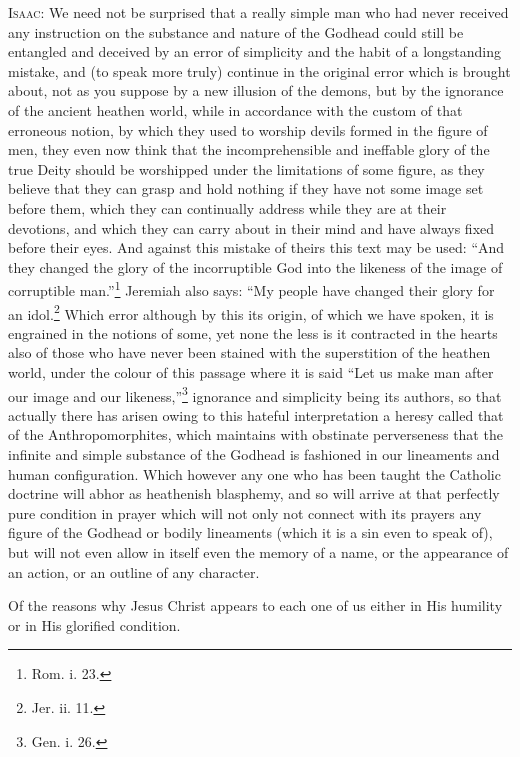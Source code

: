 \textsc{Isaac}: We need not be surprised that a really simple man who had never received any instruction on the substance and nature of the Godhead could still be entangled and deceived by an error of simplicity and the habit of a longstanding mistake, and (to speak more truly) continue in the original error which is brought about, not as you suppose by a new illusion of the demons, but by the ignorance of the ancient heathen world, while in accordance with the custom of that erroneous notion, by which they used to worship devils formed in the figure of men, they even now think that the incomprehensible and ineffable glory of the true Deity should be worshipped under the limitations of some figure, as they believe that they can grasp and hold nothing if they have not some image set before them, which they can continually address while they are at their devotions, and which they can carry about in their mind and have always fixed before their eyes. And against this mistake of theirs this text may be used: “And they changed the glory of the incorruptible God into the likeness of the image of corruptible man.”\footnote{Rom. i. 23.} Jeremiah also says: “My people have changed their glory for an idol.\footnote{Jer. ii. 11.} Which error although by this its origin, of which we have spoken, it is engrained in the notions of some, yet none the less is it contracted in the hearts also of those who have never been stained with the superstition of the heathen world, under the colour of this passage where it is said “Let us make man after our image and our likeness,”\footnote{Gen. i. 26.} ignorance and simplicity being its authors, so that actually there has arisen owing to this hateful interpretation a heresy called that of the Anthropomorphites, which maintains with obstinate perverseness that the infinite and simple substance of the Godhead is fashioned in our lineaments and human configuration. Which however any one who has been taught the Catholic doctrine will abhor as heathenish blasphemy, and so will arrive at that perfectly pure condition in prayer which will not only not connect with its prayers any figure of the Godhead or bodily lineaments (which it is a sin even to speak of), but will not even allow in itself even the memory of a name, or the appearance of an action, or an outline of any character.


Of the reasons why Jesus Christ appears to each one of us either in His humility or in His glorified condition.

